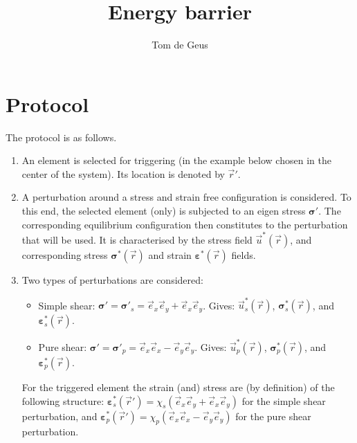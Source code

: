 \documentclass[fleqn]{goose-article}
\title{Energy barrier}
\author{Tom de Geus}
\begin{document}
\maketitle

\section*{Protocol}

The protocol is as follows.
\begin{enumerate}
    \item An element is selected for triggering
    (in the example below chosen in the center of the system).
    Its location is denoted by $\vec{r}'$.

    \item A perturbation around a stress and strain free configuration is considered.
    To this end, the selected element (only) is subjected to an eigen stress
    $\bm{\sigma}'$.
    The corresponding equilibrium configuration then constitutes to
    the perturbation that will be used.
    It is characterised by the stress field $\vec{u}^* (\vec{r})$, and corresponding
    stress $\bm{\sigma}^* (\vec{r})$
    and strain $\bm{\varepsilon}^* (\vec{r})$ fields.

    \item Two types of perturbations are considered:
    \begin{itemize}
        \item Simple shear:
        $\bm{\sigma}' = \bm{\sigma}'_s = \vec{e}_x \vec{e}_y + \vec{e}_x \vec{e}_y$.
        Gives: $\vec{u}^*_s (\vec{r})$, $\bm{\sigma}^*_s (\vec{r})$, and
        $\bm{\varepsilon}^*_s (\vec{r})$.

        \item Pure shear:
        $\bm{\sigma}' = \bm{\sigma}'_p = \vec{e}_x \vec{e}_x - \vec{e}_y \vec{e}_y$.
        Gives: $\vec{u}^*_p (\vec{r})$, $\bm{\sigma}^*_p (\vec{r})$, and
        $\bm{\varepsilon}^*_p (\vec{r})$.
    \end{itemize}

    For the triggered element the strain (and) stress are (by definition)
    of the following structure:
    $\bm{\varepsilon}^*_s (\vec{r}') = \chi_s (\vec{e}_x \vec{e}_y + \vec{e}_x \vec{e}_y)$
    for the simple shear perturbation, and
    $\bm{\varepsilon}^*_p (\vec{r}') = \chi_p (\vec{e}_x \vec{e}_x - \vec{e}_y \vec{e}_y)$
    for the pure shear perturbation.


\end{enumerate}
\end{document}
